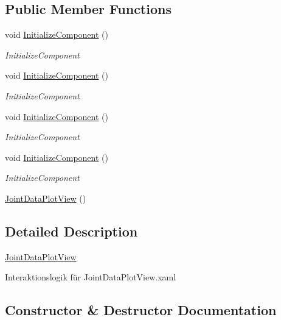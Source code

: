 \subsection*{Public Member Functions}
\begin{DoxyCompactItemize}
\item 
void \hyperlink{class_rowing_monitor_1_1_view_1_1_joint_data_plot_view_af935c9c9673d5672bb0359db871acc5d}{Initialize\+Component} ()
\begin{DoxyCompactList}\small\item\em Initialize\+Component \end{DoxyCompactList}\item 
void \hyperlink{class_rowing_monitor_1_1_view_1_1_joint_data_plot_view_af935c9c9673d5672bb0359db871acc5d}{Initialize\+Component} ()
\begin{DoxyCompactList}\small\item\em Initialize\+Component \end{DoxyCompactList}\item 
void \hyperlink{class_rowing_monitor_1_1_view_1_1_joint_data_plot_view_af935c9c9673d5672bb0359db871acc5d}{Initialize\+Component} ()
\begin{DoxyCompactList}\small\item\em Initialize\+Component \end{DoxyCompactList}\item 
void \hyperlink{class_rowing_monitor_1_1_view_1_1_joint_data_plot_view_af935c9c9673d5672bb0359db871acc5d}{Initialize\+Component} ()
\begin{DoxyCompactList}\small\item\em Initialize\+Component \end{DoxyCompactList}\item 
\hyperlink{class_rowing_monitor_1_1_view_1_1_joint_data_plot_view_a4b629e47777ec1c5a13c8e134a35ebb4}{Joint\+Data\+Plot\+View} ()
\end{DoxyCompactItemize}


\subsection{Detailed Description}
\hyperlink{class_rowing_monitor_1_1_view_1_1_joint_data_plot_view}{Joint\+Data\+Plot\+View} 

Interaktionslogik für Joint\+Data\+Plot\+View.\+xaml 

\subsection{Constructor \& Destructor Documentation}
\mbox{\label{class_rowing_monitor_1_1_view_1_1_joint_data_plot_view_a4b629e47777ec1c5a13c8e134a35ebb4}} 

